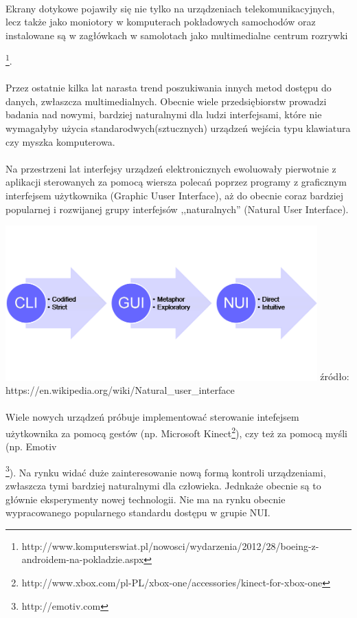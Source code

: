 \paragraph{}
Ekrany dotykowe pojawiły się nie tylko na urządzeniach telekomunikacyjnych, lecz także jako moniotory w komputerach pokładowych samochodów oraz instalowane są w zagłówkach w samolotach jako multimedialne centrum rozrywki {\footnote{http://www.komputerswiat.pl/nowosci/wydarzenia/2012/28/boeing-z-androidem-na-pokladzie.aspx}.
\paragraph{}
Przez ostatnie kilka lat narasta trend poszukiwania innych metod dostępu do danych, zwłaszcza multimedialnych. Obecnie wiele przedsiębiorstw prowadzi badania nad nowymi, bardziej naturalnymi dla ludzi interfejsami, które nie wymagałyby użycia standarodwych(sztucznych) urządzeń wejścia typu klawiatura czy myszka komputerowa.
\paragraph{}
Na przestrzeni lat interfejsy urządzeń elektronicznych ewoluowały pierwotnie z aplikacji sterowanych za pomocą wiersza polecań poprzez programy z graficznym interfejsem użytkownika (Graphic Uuser Interface), aż do obecnie coraz bardziej popularnej i rozwijanej grupy interfejsów ,,naturalnych'' (Natural User Interface).
\begin{center}
\includegraphics[width=0.9\textwidth]{images/nui.png}
\small {źródło: https://en.wikipedia.org/wiki/Natural\_user\_interface }
\end{center}
\paragraph{}
Wiele nowych urządzeń próbuje implementować sterowanie intefejsem użytkownika za pomocą gestów (np. Microsoft Kinect\footnote{http://www.xbox.com/pl-PL/xbox-one/accessories/kinect-for-xbox-one}), czy też za pomocą myśli (np. Emotiv{\footnote{http://emotiv.com}). Na rynku widać duże zainteresowanie nową formą kontroli urządzeniami, zwłaszcza tymi bardziej naturalnymi dla człowieka. Jednkaże obecnie są to głównie eksperymenty nowej technologii. Nie ma na rynku obecnie wypracowanego popularnego standardu dostępu w grupie NUI.

}}
